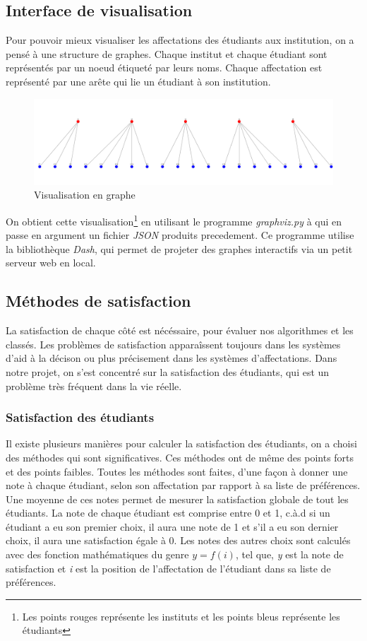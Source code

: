 \documentclass[12pt,titlepage]{article}
\begin{document}
\subsection{Interface de visualisation}

Pour pouvoir mieux visualiser les affectations des étudiants aux institution, on a pensé à une structure de graphes. Chaque institut et chaque étudiant sont représentés par un noeud étiqueté par leurs noms. Chaque affectation est représenté par une arête qui lie un étudiant à son institution.

\begin{figure}[!h]
  \centering
  \includegraphics[width = 1.0\textwidth]{img/Screen_graph_dash.png}
  \caption{Visualisation en graphe}
\end{figure}

On obtient cette visualisation\footnote{Les points rouges représente les instituts et les points bleus représente les étudiants} en utilisant le programme \textit{graphviz.py} à qui en passe en argument un fichier \textit{JSON} produits precedement. Ce programme utilise la bibliothèque \textit{Dash}, qui permet de projeter des graphes interactifs via un petit serveur web en local.

\subsection{Méthodes de satisfaction}
La satisfaction de chaque côté est nécéssaire, pour évaluer nos algorithmes et les classés. Les problèmes de satisfaction apparaîssent toujours dans les systèmes d'aid à la décison ou plus précisement dans les systèmes d'affectations. Dans notre projet, on s'est concentré sur la satisfaction des étudiants, qui est un problème très fréquent dans la vie réelle. 
\subsubsection*{Satisfaction des étudiants}
Il existe plusieurs manières pour calculer la satisfaction des étudiants, on a choisi des méthodes qui sont significatives. Ces méthodes ont de même des points forts et des points faibles.
Toutes les méthodes sont faites, d'une façon à donner une note à chaque étudiant, selon son affectation par rapport à sa liste de préférences. Une moyenne de ces notes permet de mesurer la satisfaction globale de tout les étudiants. 
La note de chaque étudiant est comprise entre 0 et 1, c.à.d si un étudiant a eu son premier choix, il aura une note de 1 et s'il a eu son dernier choix, il aura une satisfaction égale à 0. Les notes des autres choix sont calculés avec des fonction mathématiques du genre $y = f(i)$, tel que, \textit{y} est la note de satisfaction et \textit{i} est la position de l'affectation de l'étudiant dans sa liste de préférences. 
\end{document}
